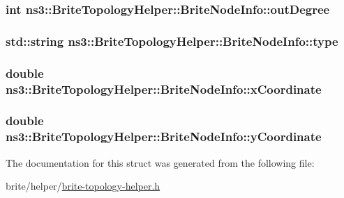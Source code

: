 \subsubsection[{\texorpdfstring{out\+Degree}{outDegree}}]{\setlength{\rightskip}{0pt plus 5cm}int ns3\+::\+Brite\+Topology\+Helper\+::\+Brite\+Node\+Info\+::out\+Degree}\hypertarget{structns3_1_1BriteTopologyHelper_1_1BriteNodeInfo_a51e75d03eaec9066e4bdbc04f8722000}{}\label{structns3_1_1BriteTopologyHelper_1_1BriteNodeInfo_a51e75d03eaec9066e4bdbc04f8722000}
\subsubsection[{\texorpdfstring{type}{type}}]{\setlength{\rightskip}{0pt plus 5cm}std\+::string ns3\+::\+Brite\+Topology\+Helper\+::\+Brite\+Node\+Info\+::type}\hypertarget{structns3_1_1BriteTopologyHelper_1_1BriteNodeInfo_a95d9b18e9d538773193ce6207099f4bd}{}\label{structns3_1_1BriteTopologyHelper_1_1BriteNodeInfo_a95d9b18e9d538773193ce6207099f4bd}
\subsubsection[{\texorpdfstring{x\+Coordinate}{xCoordinate}}]{\setlength{\rightskip}{0pt plus 5cm}double ns3\+::\+Brite\+Topology\+Helper\+::\+Brite\+Node\+Info\+::x\+Coordinate}\hypertarget{structns3_1_1BriteTopologyHelper_1_1BriteNodeInfo_a8b252b163e2837658dbf7b4b66cc848b}{}\label{structns3_1_1BriteTopologyHelper_1_1BriteNodeInfo_a8b252b163e2837658dbf7b4b66cc848b}
\subsubsection[{\texorpdfstring{y\+Coordinate}{yCoordinate}}]{\setlength{\rightskip}{0pt plus 5cm}double ns3\+::\+Brite\+Topology\+Helper\+::\+Brite\+Node\+Info\+::y\+Coordinate}\hypertarget{structns3_1_1BriteTopologyHelper_1_1BriteNodeInfo_ab35e072f7b247b4b4ae4e24992fbaac4}{}\label{structns3_1_1BriteTopologyHelper_1_1BriteNodeInfo_ab35e072f7b247b4b4ae4e24992fbaac4}


The documentation for this struct was generated from the following file\+:\begin{DoxyCompactItemize}
\item 
brite/helper/\hyperlink{brite-topology-helper_8h}{brite-\/topology-\/helper.\+h}\end{DoxyCompactItemize}
